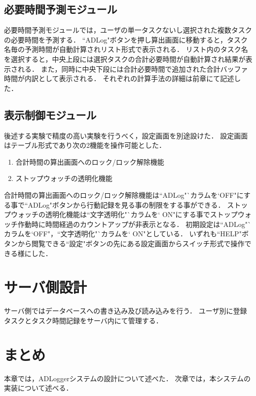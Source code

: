 \subsection{必要時間予測モジュール}
必要時間予測モジュールでは，ユーザの単一タスクないし選択された複数タスクの必要時間を予測する．
``ADLog"ボタンを押し算出画面に移動すると，タスク名毎の予測時間が自動計算されリスト形式で表示される．
リスト内のタスク名を選択すると，中央上段には選択タスクの合計必要時間が自動計算され結果が表示される．
また，同時に中央下段には合計必要時間で追加された合計バッファ時間が内訳として表示される．
それぞれの計算手法の詳細は前章にて記述した．

\subsection{表示制御モジュール}
後述する実験で精度の高い実験を行うべく，設定画面を別途設けた．
設定画面はテーブル形式であり次の2機能を操作可能とした．
\begin{enumerate}
  \item 合計時間の算出画面へのロック/ロック解除機能
  \item ストップウォッチの透明化機能
\end{enumerate}
合計時間の算出画面へのロック/ロック解除機能は``ADLog"`カラムを`OFF"にする事で``ADLog"ボタンから行動記録を見る事の制限をする事ができる．
ストップウォッチの透明化機能は``文字透明化"`カラムを` ON"にする事でストップウォッチ作動時に時間経過のカウントアップが非表示となる．
初期設定は``ADLog"`カラムを`OFF"，``文字透明化"`カラムを` ON"としている．
いずれも``HELP"ボタンから閲覧できる``設定"ボタンの先にある設定画面からスイッチ形式で操作できる様にした．


\section{サーバ側設計}
サーバ側ではデータベースへの書き込み及び読み込みを行う．
ユーザ別に登録タスクとタスク時間記録をサーバ内にて管理する．

\section{まとめ}
本章では，ADLoggerシステムの設計について述べた．
次章では，本システムの実装について述べる．